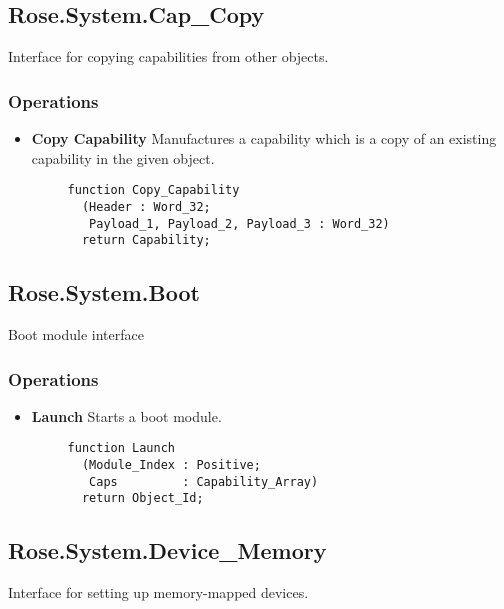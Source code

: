 \subsection{Rose.System.Cap\_Copy}

Interface for copying capabilities from other objects.

\subsubsection{Operations}

\begin{itemize}
    \item \textbf{Copy Capability} Manufactures a capability which is a copy of an existing capability in the given object.
    
    \begin{verbatim}
     function Copy_Capability
       (Header : Word_32;
        Payload_1, Payload_2, Payload_3 : Word_32)
       return Capability;    
    \end{verbatim}
    
\end{itemize}

\subsection{Rose.System.Boot}

Boot module interface

\subsubsection{Operations}

\begin{itemize}
    \item \textbf{Launch} Starts a boot module.

    \begin{verbatim}
     function Launch
       (Module_Index : Positive;
        Caps         : Capability_Array)
       return Object_Id;
    \end{verbatim}
    
\end{itemize}

\subsection{Rose.System.Device\_Memory}

Interface for setting up memory-mapped devices.

